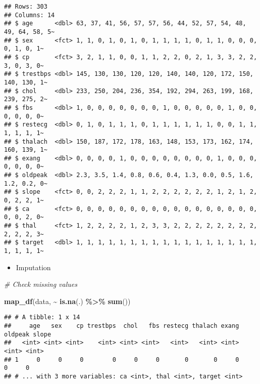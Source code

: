 \documentclass[
]{book}
\newenvironment{Shaded}{\begin{snugshade}}{\end{snugshade}}
\newcommand{\CommentTok}[1]{\textcolor[rgb]{0.56,0.35,0.01}{\textit{#1}}}
\newcommand{\KeywordTok}[1]{\textcolor[rgb]{0.13,0.29,0.53}{\textbf{#1}}}
\newcommand{\NormalTok}[1]{#1}
\newcommand{\OperatorTok}[1]{\textcolor[rgb]{0.81,0.36,0.00}{\textbf{#1}}}
\newcommand{\StringTok}[1]{\textcolor[rgb]{0.31,0.60,0.02}{#1}}
\providecommand{\tightlist}{%
  \setlength{\itemsep}{0pt}\setlength{\parskip}{0pt}}
\begin{document}
\begin{verbatim}
## Rows: 303
## Columns: 14
## $ age      <dbl> 63, 37, 41, 56, 57, 57, 56, 44, 52, 57, 54, 48, 49, 64, 58, 5~
## $ sex      <fct> 1, 1, 0, 1, 0, 1, 0, 1, 1, 1, 1, 0, 1, 1, 0, 0, 0, 0, 1, 0, 1~
## $ cp       <fct> 3, 2, 1, 1, 0, 0, 1, 1, 2, 2, 0, 2, 1, 3, 3, 2, 2, 3, 0, 3, 0~
## $ trestbps <dbl> 145, 130, 130, 120, 120, 140, 140, 120, 172, 150, 140, 130, 1~
## $ chol     <dbl> 233, 250, 204, 236, 354, 192, 294, 263, 199, 168, 239, 275, 2~
## $ fbs      <dbl> 1, 0, 0, 0, 0, 0, 0, 0, 1, 0, 0, 0, 0, 0, 1, 0, 0, 0, 0, 0, 0~
## $ restecg  <dbl> 0, 1, 0, 1, 1, 1, 0, 1, 1, 1, 1, 1, 1, 0, 0, 1, 1, 1, 1, 1, 1~
## $ thalach  <dbl> 150, 187, 172, 178, 163, 148, 153, 173, 162, 174, 160, 139, 1~
## $ exang    <dbl> 0, 0, 0, 0, 1, 0, 0, 0, 0, 0, 0, 0, 0, 1, 0, 0, 0, 0, 0, 0, 0~
## $ oldpeak  <dbl> 2.3, 3.5, 1.4, 0.8, 0.6, 0.4, 1.3, 0.0, 0.5, 1.6, 1.2, 0.2, 0~
## $ slope    <fct> 0, 0, 2, 2, 2, 1, 1, 2, 2, 2, 2, 2, 2, 1, 2, 1, 2, 0, 2, 2, 1~
## $ ca       <fct> 0, 0, 0, 0, 0, 0, 0, 0, 0, 0, 0, 0, 0, 0, 0, 0, 0, 0, 0, 2, 0~
## $ thal     <fct> 1, 2, 2, 2, 2, 1, 2, 3, 3, 2, 2, 2, 2, 2, 2, 2, 2, 2, 2, 2, 3~
## $ target   <dbl> 1, 1, 1, 1, 1, 1, 1, 1, 1, 1, 1, 1, 1, 1, 1, 1, 1, 1, 1, 1, 1~
\end{verbatim}

\begin{itemize}
\tightlist
\item
  Imputation
\end{itemize}

\begin{Shaded}
\begin{Highlighting}[]
\CommentTok{\# Check missing values}

\KeywordTok{map\_df}\NormalTok{(data, }\OperatorTok{\textasciitilde{}}\StringTok{ }\KeywordTok{is.na}\NormalTok{(.) }\OperatorTok{\%\textgreater{}\%}\StringTok{ }\KeywordTok{sum}\NormalTok{())}
\end{Highlighting}
\end{Shaded}

\begin{verbatim}
## # A tibble: 1 x 14
##     age   sex    cp trestbps  chol   fbs restecg thalach exang oldpeak slope
##   <int> <int> <int>    <int> <int> <int>   <int>   <int> <int>   <int> <int>
## 1     0     0     0        0     0     0       0       0     0       0     0
## # ... with 3 more variables: ca <int>, thal <int>, target <int>
\end{verbatim}
\end{document}
